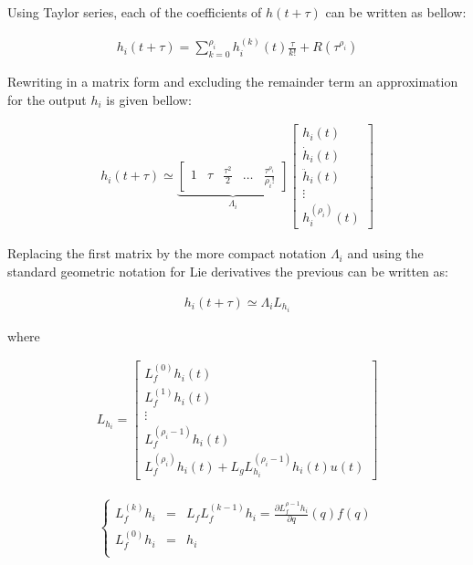 \documentclass[letterpaper, 10 pt, conference]{ieeeconf}  %
\begin{document}
Using Taylor series, each of the coefficients of ${h(t+\tau)}$ can be written as bellow:

\begin{align*}
h_i(t+\tau) = \sum_{k=0}^{\rho_i} 
h^{(k)}_i(t)\frac{\tau}{k!} + R(\tau^{\rho_i})
\end{align*}

Rewriting in a matrix form and excluding the remainder term an approximation for the output $h_i$ is given bellow:

\begin{eqnarray}
h_i(t+\tau) \simeq \underbrace{\left[\begin{array}{ccccc}
1 & \tau & \frac{\tau^2}{2} & \dots & \frac{\tau^{\rho_i}}{{\rho_i}!}
\end{array}\right]}_{\Lambda_i}
\left[\begin{array}{c}
h_i(t)\\
\dot{h}_i(t)\\
\ddot{h}_i(t)\\
\vdots\\
h^{(\rho_i)}_i(t)
\end{array}\right]
\end{eqnarray}

Replacing the first matrix by the more compact notation $\Lambda_i$ and using the standard geometric notation for Lie derivatives the previous can be written as:

\begin{eqnarray}
h_i(t+\tau) \simeq \Lambda_i L_{h_i}
\end{eqnarray}

where

\begin{eqnarray*}
L_{h_i} = \left[\begin{array}{c}
L_f^{(0)}h_i(t)\\
L_f^{(1)}h_i(t)\\
\vdots\\
L^{({\rho_i}-1)}_fh_i(t)\\
L^{({\rho_i})}_fh_i(t)+L_gL_{h_i}^{({\rho_i}-1)}h_i(t)u(t)
\end{array}\right]
\end{eqnarray*}


\begin{eqnarray*}
\left\lbrace\begin{array}{lcl}
L_f^{(k)} h_i & = & L_fL_f^{(k-1)}h_i = \frac{\partial L_f^{\rho-1}h_i}{\partial q}(q)f(q)\\
L_f^{(0)}h_i & = & h_i\\
\end{array}\right.
\end{eqnarray*}
\end{document}
